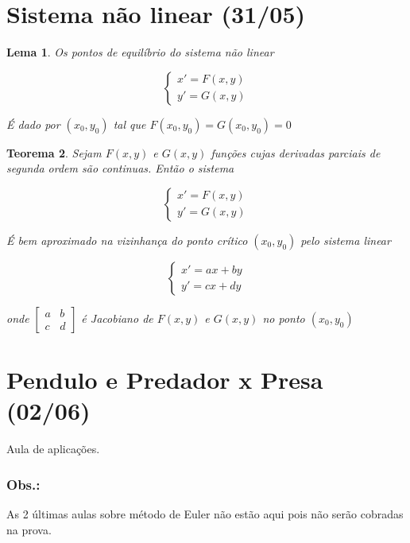 \documentclass[12pt]{article}
\newtheorem{theorem}{Teorema}[section]
\newtheorem{lemma}[theorem]{Lema}
\begin{document}
\section{Sistema não linear (31/05)}
\begin{lemma}
    Os pontos de equilíbrio do sistema não linear
    
    $$ \left \{
    \begin{array}{ll}
        x' = F(x, y) \\
        y' = G(x, y)
    \end{array} \right .
    $$
    
    É dado por $(x_0, y_0)$ tal que $F(x_0, y_0) = G(x_0, y_0) = 0$ 
\end{lemma}

\begin{theorem}
    Sejam $F(x, y)$ e $G(x, y)$ funções cujas derivadas parciais de segunda ordem são continuas. Então o sistema
    
    $$ \left \{
    \begin{array}{ll}
        x' = F(x, y) \\
        y' = G(x, y)
    \end{array} \right .
    $$
    
    É bem aproximado na vizinhança do ponto crítico $(x_0, y_0)$ pelo sistema linear
    
    $$ \left \{
    \begin{array}{ll}
        x' = a x + b y \\
        y' = c x + d y
    \end{array} \right .
    $$
    
    onde $\left [ \begin{array}{cc}
        a & b \\
        c & d
    \end{array} \right ]$ é Jacobiano de $F(x, y)$ e $G(x, y)$ no ponto $(x_0, y_0)$
\end{theorem}

\section{Pendulo e Predador x Presa (02/06)}
Aula de aplicações.

\subsubsection*{Obs.:} As 2 últimas aulas sobre método de Euler não estão aqui pois não serão cobradas na prova.
\end{document}
